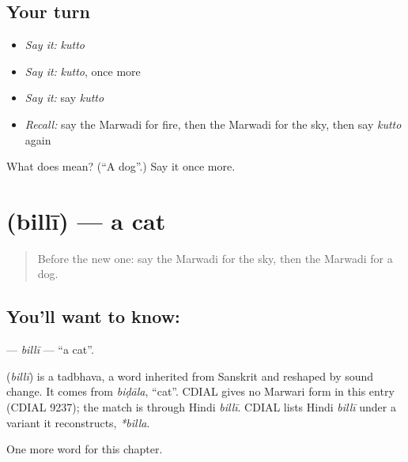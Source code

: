 \subsection*{Your turn}
\begin{itemize}
\raggedright
  \item \emph{Say it:} \emph{kutto}
  \item \emph{Say it:} \emph{kutto}, once more
  \item \emph{Say it:} say \emph{kutto}
  \item \emph{Recall:} say the Marwadi for fire, then the Marwadi for the sky, then say \emph{kutto} again
\end{itemize}

\begin{tcolorbox}[breakable,colback=teal!4,colframe=teal!35!black,title={Before you move on}]
What does  mean? (\textquotedblleft{}A dog\textquotedblright{}.) Say it once more.
\end{tcolorbox}
\section[\texorpdfstring{\mw{बिल्ली} (billī)}{बिल्ली (billī)}]{ (billī) — a cat}

\label{lesson:MW-C70-billi}



\begin{quote}
Before the new one: say the Marwadi for the sky, then the Marwadi for a dog.
\end{quote}

\subsection*{You'll want to know: }
\textbf{} — \emph{billī} — \textquotedblleft{}a cat\textquotedblright{}.

\begin{cousinweb}
\textbf{} (\emph{billī}) is a tadbhava, a word inherited from Sanskrit and reshaped by sound change. It comes from \emph{biḍāla}, \textquotedblleft{}cat\textquotedblright{}. CDIAL gives no Marwari form in this entry (CDIAL 9237); the match is through Hindi \emph{billī}. CDIAL lists Hindi \emph{billī} under a variant it reconstructs, \emph{*billa}.
\end{cousinweb}

\begin{grammarlens}[title={What you've built}]
One more word for this chapter.
\end{grammarlens}

